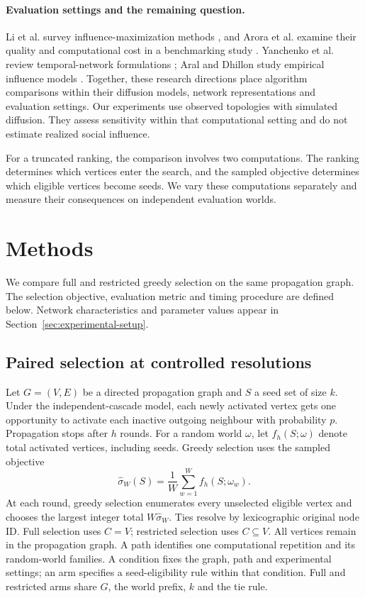 \documentclass[smallextended]{svjour3}
\begin{document}
\paragraph{Evaluation settings and the remaining question.} Li et al. survey influence-maximization methods \cite{ref9}, and Arora et al. examine their quality and computational cost in a benchmarking study \cite{ref16}. Yanchenko et al. review temporal-network formulations \cite{ref11}; Aral and Dhillon study empirical influence models \cite{ref15}. Together, these research directions place algorithm comparisons within their diffusion models, network representations and evaluation settings. Our experiments use observed topologies with simulated diffusion. They assess sensitivity within that computational setting and do not estimate realized social influence.

For a truncated ranking, the comparison involves two computations. The ranking determines which vertices enter the search, and the sampled objective determines which eligible vertices become seeds. We vary these computations separately and measure their consequences on independent evaluation worlds.

\section{Methods}
We compare full and restricted greedy selection on the same propagation graph. The selection objective, evaluation metric and timing procedure are defined below. Network characteristics and parameter values appear in Section~\ref{sec:experimental-setup}.
\subsection{Paired selection at controlled resolutions}
Let $G=(V,E)$ be a directed propagation graph and $S$ a seed set of size $k$. Under the independent-cascade model, each newly activated vertex gets one opportunity to activate each inactive outgoing neighbour with probability $p$. Propagation stops after $h$ rounds. For a random world $\omega$, let $f_h(S;\omega)$ denote total activated vertices, including seeds. Greedy selection uses the sampled objective
\begin{equation}
\widehat\sigma_W(S)=\frac{1}{W}\sum_{w=1}^{W}f_h(S;\omega_w).
\end{equation}
At each round, greedy selection enumerates every unselected eligible vertex and chooses the largest integer total $W\widehat\sigma_W$. Ties resolve by lexicographic original node ID. Full selection uses $C=V$; restricted selection uses $C\subseteq V$. All vertices remain in the propagation graph. A path identifies one computational repetition and its random-world families. A condition fixes the graph, path and experimental settings; an arm specifies a seed-eligibility rule within that condition. Full and restricted arms share $G$, the world prefix, $k$ and the tie rule.
\end{document}
